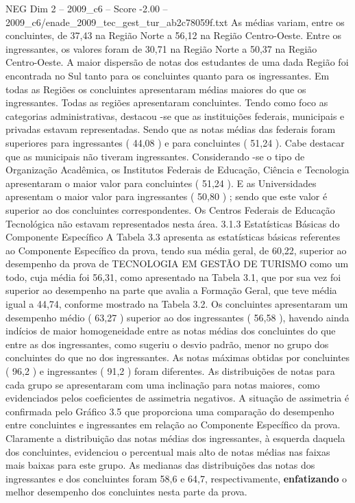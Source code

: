 \begin{textsample}{NEG Dim 2 – 2009\_c6 – Score -2.00 – 2009\_c6/enade\_2009\_tec\_gest\_tur\_ab2c78059f.txt}
As médias variam, entre os concluintes, de 37,43 na Região Norte a 56,12 na Região Centro-Oeste.
Entre os ingressantes, os valores foram de 30,71 na Região Norte a 50,37 na Região Centro-Oeste.
A maior dispersão de notas dos estudantes de uma dada Região foi encontrada no Sul tanto para os concluintes quanto para os ingressantes.
Em todas as Regiões os concluintes apresentaram médias maiores do que os ingressantes.
Todas as regiões apresentaram concluintes.
Tendo como foco as categorias administrativas, destacou -se que as instituições federais, municipais e privadas estavam representadas.
Sendo que as notas médias das federais foram superiores para ingressantes ( 44,08 ) e para concluintes ( 51,24 ).
Cabe destacar que as municipais não tiveram ingressantes.
Considerando -se o tipo de Organização Acadêmica, os Institutos Federais de Educação, Ciência e Tecnologia apresentaram o maior valor para concluintes ( 51,24 ).
E as Universidades apresentam o maior valor para ingressantes ( 50,80 ) ; sendo que este valor é superior ao dos concluintes correspondentes.
Os Centros Federais de Educação Tecnológica não estavam representados nesta área. 3.1.3 Estatísticas Básicas do Componente Específico A Tabela 3.3 apresenta as estatísticas básicas referentes ao Componente Específico da prova, tendo sua média geral, de 60,22, superior ao desempenho da prova de TECNOLOGIA EM GESTÃO DE TURISMO como um todo, cuja média foi 56,31, como apresentado na Tabela 3.1, que por sua vez foi superior ao desempenho na parte que avalia a Formação Geral, que teve média igual a 44,74, conforme mostrado na Tabela 3.2.
Os concluintes apresentaram um desempenho médio ( 63,27 ) superior ao dos ingressantes ( 56,58 ), havendo ainda indícios de maior homogeneidade entre as notas médias dos concluintes do que entre as dos ingressantes, como sugeriu o desvio padrão, menor no grupo dos concluintes do que no dos ingressantes.
As notas máximas obtidas por concluintes ( 96,2 ) e ingressantes ( 91,2 ) foram diferentes.
As distribuições de notas para cada grupo se apresentaram com uma inclinação para notas maiores, como evidenciados pelos coeficientes de assimetria negativos.
A situação de assimetria é confirmada pelo Gráfico 3.5 que proporciona uma comparação do desempenho entre concluintes e ingressantes em relação ao Componente Específico da prova.
Claramente a distribuição das notas médias dos ingressantes, à esquerda daquela dos concluintes, evidenciou o percentual mais alto de notas médias nas faixas mais baixas para este grupo.
As medianas das distribuições das notas dos ingressantes e dos concluintes foram 58,6 e 64,7, respectivamente, \textbf{enfatizando} o melhor desempenho dos concluintes nesta parte da prova.

\end{textsample}
